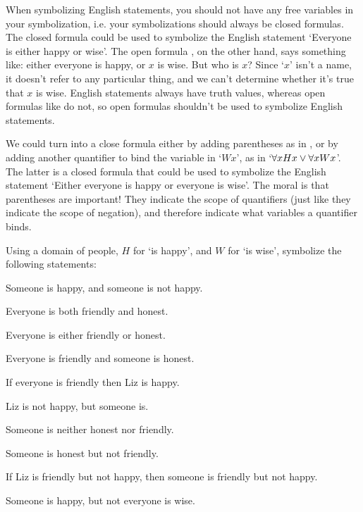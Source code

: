 When symbolizing English statements, you should not have any free variables in your symbolization, i.e. your symbolizations should always be closed formulas. The closed formula  could be used to symbolize the English statement `Everyone is either happy or wise'.  The open formula , on the other hand, says something like: either everyone is happy, or $x$ is wise.  But who is $x$?  Since `$x$' isn't a name, it doesn't refer to any particular thing, and we can't determine whether it's true that $x$ is wise.   English statements always have truth values, whereas open formulas like  do not, so open formulas shouldn't be used to symbolize English statements.

We could turn  into a close formula either by adding parentheses as in , or by adding another quantifier to bind the variable in `$Wx$', as in `$\forall x Hx \vee \forall xWx$'.  The latter is  a closed formula that could be used to symbolize the English statement `Either everyone is happy or everyone is wise'.  The moral is that parentheses are important! They indicate the scope of quantifiers (just like they indicate the scope of negation), and therefore indicate what variables a quantifier binds.

\practiceproblems

\problempart Using a domain of people, $H$ for `\blank is happy', and $W$ for `\blank is wise', symbolize the following statements:

\begin{earg}
\item Someone is happy, and someone is not happy.
\item Everyone is both friendly and honest.
\item Everyone is either friendly or honest.
\item Everyone is friendly and someone is honest.
\item If everyone is friendly then Liz is happy.
\item Liz is not happy, but someone is.
\item Someone is neither honest nor friendly.
\item Someone is honest but not friendly.
\item If Liz is friendly but not happy, then someone is friendly but not happy.
\item Someone is happy, but not everyone is wise.
\end{earg}



